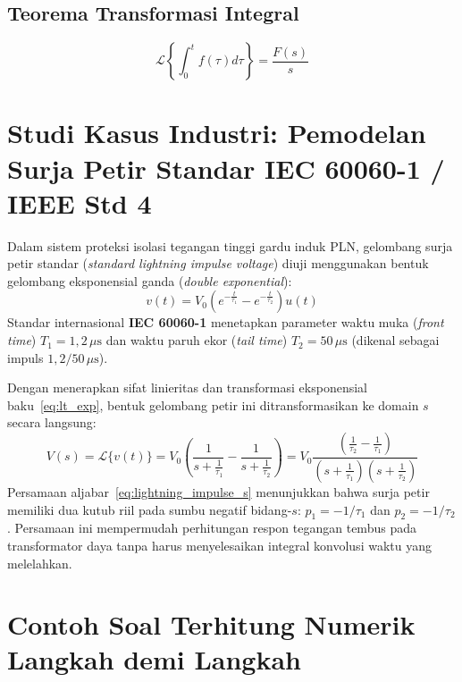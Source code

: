 \documentclass[11pt,a4paper]{article}
\theoremstyle{definition}
\begin{document}
\subsection{Teorema Transformasi Integral}
\begin{equation}
    \mathcal{L}\left\{ \int_0^t f(\tau) d\tau \right\} = \frac{F(s)}{s}
    \label{eq:integral_theorem}
\end{equation}

\section{Studi Kasus Industri: Pemodelan Surja Petir Standar IEC 60060-1 / IEEE Std 4}

Dalam sistem proteksi isolasi tegangan tinggi gardu induk PLN, gelombang surja petir standar (\textit{standard lightning impulse voltage}) diuji menggunakan bentuk gelombang eksponensial ganda (\textit{double exponential}):
\begin{equation}
    v(t) = V_0 \left( e^{-\frac{t}{\tau_1}} - e^{-\frac{t}{\tau_2}} \right) u(t)
    \label{eq:lightning_impulse_time}
\end{equation}
Standar internasional \textbf{IEC 60060-1} menetapkan parameter waktu muka (\textit{front time}) $T_1 = 1{,}2\,\mu\text{s}$ dan waktu paruh ekor (\textit{tail time}) $T_2 = 50\,\mu\text{s}$ (dikenal sebagai impuls $1{,}2/50\,\mu\text{s}$).

Dengan menerapkan sifat linieritas dan transformasi eksponensial baku~\eqref{eq:lt_exp}, bentuk gelombang petir ini ditransformasikan ke domain $s$ secara langsung:
\begin{equation}
    V(s) = \mathcal{L}\{v(t)\} = V_0 \left( \frac{1}{s + \frac{1}{\tau_1}} - \frac{1}{s + \frac{1}{\tau_2}} \right) = V_0 \frac{\left(\frac{1}{\tau_2} - \frac{1}{\tau_1}\right)}{\left(s + \frac{1}{\tau_1}\right)\left(s + \frac{1}{\tau_2}\right)}
    \label{eq:lightning_impulse_s}
\end{equation}
Persamaan aljabar~\eqref{eq:lightning_impulse_s} menunjukkan bahwa surja petir memiliki dua kutub riil pada sumbu negatif bidang-$s$: $p_1 = -1/\tau_1$ dan $p_2 = -1/\tau_2$. Persamaan ini mempermudah perhitungan respon tegangan tembus pada transformator daya tanpa harus menyelesaikan integral konvolusi waktu yang melelahkan.

\section{Contoh Soal Terhitung Numerik Langkah demi Langkah}
\end{document}
